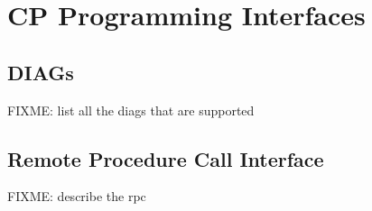 \chapter{CP Programming Interfaces}
\section{DIAGs}
FIXME: list all the diags that are supported
\section{Remote Procedure Call Interface}
FIXME: describe the rpc
